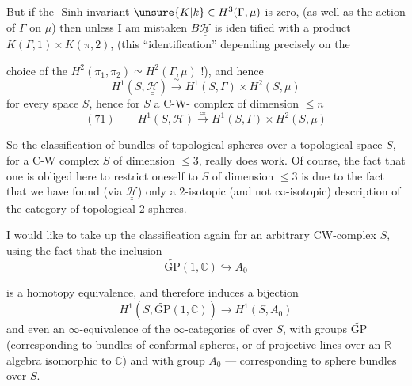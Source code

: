 But if the -Sinh invariant
$\unsure{K|k}\in H^3(\Gamma,\mu)$ is zero,
 (as well as the action
of $\Gamma$ on $\mu$) then unless I am mistaken
$B\underline{\underline{\mathcal H}}$ is iden%
tified with a product $K(\Gamma,1)\times K(\pi,2)$,
(this ``identification'' depending precisely on the

choice of the $H^2(\pi_1,\pi_2)\simeq H^2(\Gamma,\mu)$ !), and
hence
\[
H^1(S,\underline{\underline{\mathcal H}})\xrightarrow{\simeq}
H^1(S,\Gamma)\times H^2(S,\mu)
\]
for every space $S$, hence for $S$ a C-W-%
complex of dimension $\leq n$
\[
(71)\qquad
H^1(S,\mathcal H)\xrightarrow{\simeq}H^1(S,\Gamma)\times H^2(S,\mu)
\]

So the classification of bundles of topological
spheres over a topological space $S$,
for a C-W complex $S$ of dimension $\leq3$,
really does work. Of course, the
fact that one is obliged here to restrict oneself to
 $S$ of dimension $\leq3$ is due to the fact
that we have found 
(via $\underline{\underline{\mathcal H}}$)
only a $2$-isotopic (and not
$\infty$-isotopic) description of the category of
topological $2$-spheres.

I would like to take up the classification again
for an arbitrary CW-complex $S$,
using the fact that the inclusion
\[
\widetilde{\mathrm{GP}}(1,\mathbb C)\hookrightarrow A_0
\]

is a homotopy equivalence, and therefore
induces a bijection
\[
H^1(S,\widetilde{\mathrm{GP}}(1,\mathbb C))\longrightarrow H^1(S,A_0)
\]
and even an $\infty$-equivalence of the $\infty$-categories of
  over $S$, with  groups
$\widetilde{\mathrm{GP}}$ (corresponding
to bundles of conformal spheres, or of
projective lines over an  $\mathbb R$-algebra
isomorphic to $\mathbb C$) and with group $A_0$ --- corresponding
to sphere bundles over $S$.

